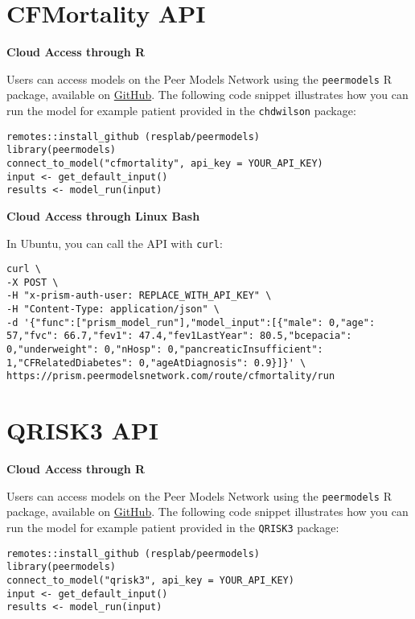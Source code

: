 \documentclass[
]{book}
\begin{document}
\hypertarget{cfmortality-api}{%
\section{CFMortality API}\label{cfmortality-api}}

\textbf{Cloud Access through R}

Users can access models on the Peer Models Network using the \texttt{peermodels} R package, available on \href{https://github.com/resplab/peermodels}{GitHub}. The following code snippet illustrates how you can run the model for example patient provided in the \texttt{chdwilson} package:

\begin{verbatim}
remotes::install_github (resplab/peermodels)
library(peermodels)
connect_to_model("cfmortality", api_key = YOUR_API_KEY)
input <- get_default_input()
results <- model_run(input)
\end{verbatim}

\textbf{Cloud Access through Linux Bash}

In Ubuntu, you can call the API with \texttt{curl}:

\begin{verbatim}
curl \
-X POST \
-H "x-prism-auth-user: REPLACE_WITH_API_KEY" \
-H "Content-Type: application/json" \
-d '{"func":["prism_model_run"],"model_input":[{"male": 0,"age": 57,"fvc": 66.7,"fev1": 47.4,"fev1LastYear": 80.5,"bcepacia": 0,"underweight": 0,"nHosp": 0,"pancreaticInsufficient": 1,"CFRelatedDiabetes": 0,"ageAtDiagnosis": 0.9}]}' \
https://prism.peermodelsnetwork.com/route/cfmortality/run
\end{verbatim}

\hypertarget{qrisk3-api}{%
\section{QRISK3 API}\label{qrisk3-api}}

\textbf{Cloud Access through R}

Users can access models on the Peer Models Network using the \texttt{peermodels} R package, available on \href{https://github.com/resplab/peermodels}{GitHub}. The following code snippet illustrates how you can run the model for example patient provided in the \texttt{QRISK3} package:

\begin{verbatim}
remotes::install_github (resplab/peermodels)
library(peermodels)
connect_to_model("qrisk3", api_key = YOUR_API_KEY)
input <- get_default_input()
results <- model_run(input)
\end{verbatim}
\end{document}
